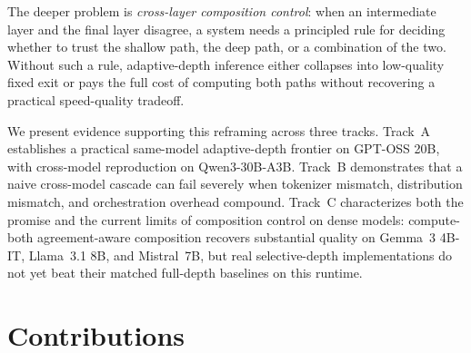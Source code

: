 \documentclass[11pt]{article}
\begin{document}
The deeper problem is \emph{cross-layer composition control}: when an intermediate layer and the final layer disagree, a system needs a principled rule for deciding whether to trust the shallow path, the deep path, or a combination of the two. Without such a rule, adaptive-depth inference either collapses into low-quality fixed exit or pays the full cost of computing both paths without recovering a practical speed-quality tradeoff.

We present evidence supporting this reframing across three tracks. Track~A establishes a practical same-model adaptive-depth frontier on GPT-OSS 20B, with cross-model reproduction on Qwen3-30B-A3B. Track~B demonstrates that a naive cross-model cascade can fail severely when tokenizer mismatch, distribution mismatch, and orchestration overhead compound. Track~C characterizes both the promise and the current limits of composition control on dense models: compute-both agreement-aware composition recovers substantial quality on Gemma~3 4B-IT, Llama~3.1 8B, and Mistral~7B, but real selective-depth implementations do not yet beat their matched full-depth baselines on this runtime.

\section{Contributions}
\end{document}
